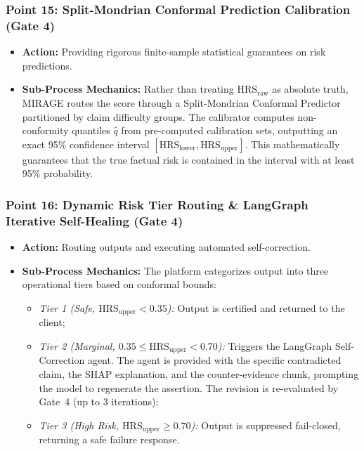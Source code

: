\documentclass[11pt,a4paper]{article}
\begin{document}
\subsubsection*{Point 15: Split-Mondrian Conformal Prediction Calibration (Gate 4)}
\begin{itemize}[leftmargin=*,itemsep=1pt]
  \item \textbf{Action:} Providing rigorous finite-sample statistical guarantees on risk predictions.
  \item \textbf{Sub-Process Mechanics:} Rather than treating $\text{HRS}_{\text{raw}}$ as absolute truth, MIRAGE routes the score through a Split-Mondrian Conformal Predictor partitioned by claim difficulty groups. The calibrator computes non-conformity quantiles $\hat{q}$ from pre-computed calibration sets, outputting an exact 95\% confidence interval $[\text{HRS}_{\text{lower}}, \text{HRS}_{\text{upper}}]$. This mathematically guarantees that the true factual risk is contained in the interval with at least 95\% probability.
\end{itemize}

\subsubsection*{Point 16: Dynamic Risk Tier Routing \& LangGraph Iterative Self-Healing (Gate 4)}
\begin{itemize}[leftmargin=*,itemsep=1pt]
  \item \textbf{Action:} Routing outputs and executing automated self-correction.
  \item \textbf{Sub-Process Mechanics:} The platform categorizes output into three operational tiers based on conformal bounds:
    \begin{itemize}[leftmargin=*,itemsep=1pt]
      \item \emph{Tier 1 (Safe, $\text{HRS}_{\text{upper}} < 0.35$):} Output is certified and returned to the client;
      \item \emph{Tier 2 (Marginal, $0.35 \le \text{HRS}_{\text{upper}} < 0.70$):} Triggers the LangGraph Self-Correction agent. The agent is provided with the specific contradicted claim, the SHAP explanation, and the counter-evidence chunk, prompting the model to regenerate the assertion. The revision is re-evaluated by Gate~4 (up to 3 iterations);
      \item \emph{Tier 3 (High Risk, $\text{HRS}_{\text{upper}} \ge 0.70$):} Output is suppressed fail-closed, returning a safe failure response.
    \end{itemize}
\end{itemize}
\end{document}
